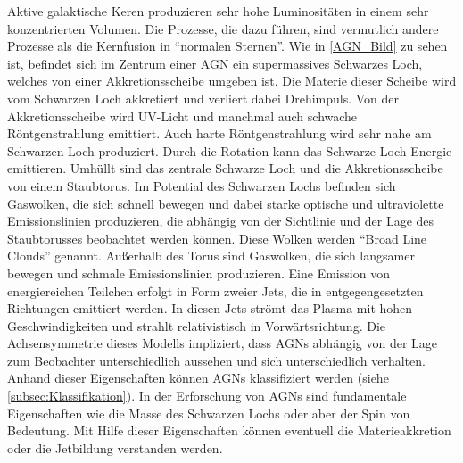 
Aktive galaktische Keren produzieren sehr hohe Luminositäten in einem sehr konzentrierten Volumen.
Die Prozesse, die dazu führen, sind vermutlich andere Prozesse als die Kernfusion in ``normalen Sternen''.
Wie in \autoref{AGN_Bild} zu sehen ist, befindet sich im Zentrum einer AGN ein supermassives Schwarzes Loch, welches von einer Akkretionsscheibe umgeben ist.
Die Materie dieser Scheibe wird vom Schwarzen Loch akkretiert und verliert dabei Drehimpuls.
Von der Akkretionsscheibe wird UV-Licht und manchmal auch schwache Röntgenstrahlung emittiert.
Auch harte Röntgenstrahlung wird sehr nahe am Schwarzen Loch produziert.
Durch die Rotation kann das Schwarze Loch Energie emittieren.
Umhüllt sind das zentrale Schwarze Loch und die Akkretionsscheibe von einem Staubtorus.
Im Potential des Schwarzen Lochs befinden sich Gaswolken, die sich schnell bewegen und dabei starke optische und ultraviolette Emissionslinien produzieren, die abhängig von der Sichtlinie und der Lage des Staubtorusses beobachtet werden können. 
Diese Wolken werden ``Broad Line Clouds'' genannt.
Außerhalb des Torus sind Gaswolken, die sich langsamer bewegen und schmale Emissionslinien produzieren.
Eine Emission von energiereichen Teilchen erfolgt in Form zweier Jets, die in entgegengesetzten Richtungen emittiert werden.
In diesen Jets strömt das Plasma mit hohen Geschwindigkeiten und strahlt relativistisch in Vorwärtsrichtung.
Die Achsensymmetrie dieses Modells impliziert, dass AGNs abhängig von der Lage zum Beobachter unterschiedlich aussehen und sich unterschiedlich verhalten.
Anhand dieser Eigenschaften können AGNs klassifiziert werden (siehe \autoref{subsec:Klassifikation}).
In der Erforschung von AGNs sind fundamentale Eigenschaften wie die Masse des Schwarzen Lochs oder aber der Spin von Bedeutung.
Mit Hilfe dieser Eigenschaften können eventuell die Materieakkretion oder die Jetbildung verstanden werden.\cite{Urry_Padovani}


